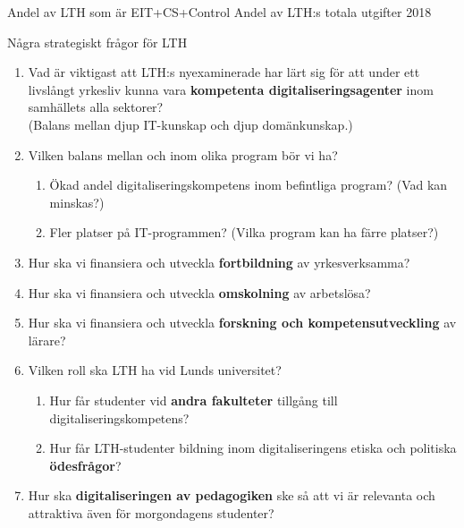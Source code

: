 \documentclass[aspectratio=169]{beamer}
\newenvironment{Slide}[1]%
  {\begin{frame}[environment=Slide]{#1}}
  {\end{frame}}%
\begin{document}
\begin{Slide}{Andel av LTH som är EIT+CS+Control}
Andel av LTH:s totala utgifter 2018
\end{Slide}

\begin{Slide}{Några strategiskt frågor för LTH}
  \begin{enumerate}\small
    \item Vad är viktigast att LTH:s nyexaminerade har lärt sig för att under ett livslångt yrkesliv kunna vara \textbf{kompetenta digitaliseringsagenter} inom samhällets alla sektorer? \\(Balans mellan djup IT-kunskap och djup domänkunskap.)
    \item Vilken balans mellan och inom olika program bör vi ha?
    \begin{enumerate}
      \item Ökad andel digitaliseringskompetens inom befintliga program? (Vad kan minskas?)
      \item Fler platser på IT-programmen? (Vilka program kan ha färre platser?)
    \end{enumerate}  
    \item Hur ska vi finansiera och utveckla \textbf{fortbildning} av yrkesverksamma?
    \item Hur ska vi finansiera och utveckla \textbf{omskolning} av arbetslösa?
    \item Hur ska vi finansiera och utveckla  \textbf{forskning och kompetensutveckling} av lärare?
    \item Vilken roll ska LTH ha vid Lunds universitet?
    \begin{enumerate}
      \item Hur får studenter vid \textbf{andra fakulteter} tillgång till digitaliseringskompetens?
      \item Hur får LTH-studenter bildning inom digitaliseringens etiska och politiska \textbf{ödesfrågor}?
    \end{enumerate}  
    \item Hur ska \textbf{digitaliseringen av pedagogiken} ske så att vi är relevanta och attraktiva även för morgondagens studenter?
  \end{enumerate}  
\end{Slide}
\end{document}
